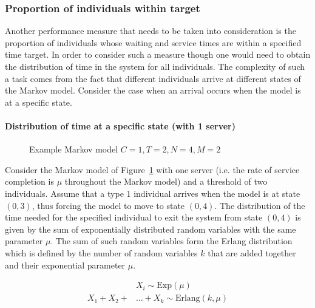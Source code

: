\subsubsection{Proportion of individuals within target}
\label{sec:proportion_of_individuals_within_time}

Another performance measure that needs to be taken into consideration is the
proportion of individuals whose waiting and service times are within a
specified time target.
In order to consider such a measure though one would need to obtain the
distribution of time in the system for all individuals.
The complexity of such a task comes from the fact that different individuals
arrive at different states of the Markov model.
Consider the case when an arrival occurs when the model is at a specific state.

\paragraph{Distribution of time at a specific state (with 1 server)}

\begin{figure}[h]
    \centering
    \scalebox{0.75}{}
    \caption{Example Markov model \(C=1, T=2, N=4, M=2\)}
    \label{fig:distribution_of_time_at_specific_state_1_server}
\end{figure}

Consider the Markov model of
Figure~\ref{fig:distribution_of_time_at_specific_state_1_server}
with one server (i.e.
the rate of service completion is \(\mu\) throughout the Markov model)
and a threshold of two individuals.
Assume that a type 1 individual arrives when the model is at state
\((0,3)\), thus forcing the model to move to state \((0,4)\).
The distribution of the time needed for the specified individual to exit the
system from state \((0,4)\) is given by the sum of exponentially distributed
random variables with the same parameter \(\mu\).
The sum of such random variables form the Erlang distribution which is defined
by the number of random variables \(k\) that are added together and their
exponential parameter \(\mu\).

\begin{align}
    & X_i \sim \text{Exp}(\mu) \nonumber \\
    X_1 + X_2 + & \dots + X_k \sim \text{Erlang}(k,\mu)
    \label{eq:erlang_distribution_definition}
\end{align}

